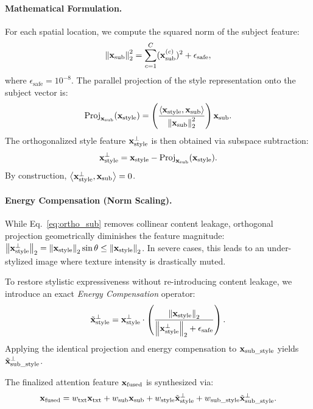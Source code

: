 \paragraph{Mathematical Formulation.}
For each spatial location, we compute the squared norm of the subject feature:
\begin{equation}
    \left\lVert\mathbf{x}_{\text{sub}}\right\rVert_2^2 = \sum_{c=1}^C (\mathbf{x}_{\text{sub}}^{(c)})^2 + \epsilon_{\text{safe}},
\end{equation}
where $\epsilon_{\text{safe}} = 10^{-8}$. The parallel projection of the style representation onto the subject vector is:
\begin{equation}
    \text{Proj}_{\mathbf{x}_{\text{sub}}}(\mathbf{x}_{\text{style}}) = \left( \frac{\left\langle \mathbf{x}_{\text{style}}, \mathbf{x}_{\text{sub}} \right\rangle}{\left\lVert\mathbf{x}_{\text{sub}}\right\rVert_2^2} \right) \mathbf{x}_{\text{sub}}.
\end{equation}
The orthogonalized style feature $\mathbf{x}_{\text{style}}^\perp$ is then obtained via subspace subtraction:
\begin{equation}
    \mathbf{x}_{\text{style}}^\perp = \mathbf{x}_{\text{style}} - \text{Proj}_{\mathbf{x}_{\text{sub}}}(\mathbf{x}_{\text{style}}).
    \label{eq:ortho_sub}
\end{equation}
By construction, $\left\langle \mathbf{x}_{\text{style}}^\perp, \mathbf{x}_{\text{sub}} \right\rangle = 0$.

\paragraph{Energy Compensation (Norm Scaling).}
While Eq.~\eqref{eq:ortho_sub} removes collinear content leakage, orthogonal projection geometrically diminishes the feature magnitude: $\left\lVert\mathbf{x}_{\text{style}}^\perp\right\rVert_2 = \left\lVert\mathbf{x}_{\text{style}}\right\rVert_2 \sin \theta \le \left\lVert\mathbf{x}_{\text{style}}\right\rVert_2$. In severe cases, this leads to an under-stylized image where texture intensity is drastically muted.

To restore stylistic expressiveness without re-introducing content leakage, we introduce an exact \textit{Energy Compensation} operator:
\begin{equation}
    \tilde{\mathbf{x}}_{\text{style}}^\perp = \mathbf{x}_{\text{style}}^\perp \cdot \left( \frac{\left\lVert\mathbf{x}_{\text{style}}\right\rVert_2}{\left\lVert\mathbf{x}_{\text{style}}^\perp\right\rVert_2 + \epsilon_{\text{safe}}} \right).
    \label{eq:energy_comp}
\end{equation}
Applying the identical projection and energy compensation to $\mathbf{x}_{\text{sub\_style}}$ yields $\tilde{\mathbf{x}}_{\text{sub\_style}}^\perp$. 

The finalized attention feature $\mathbf{x}_{\text{fused}}$ is synthesized via:
\begin{equation}
    \mathbf{x}_{\text{fused}} = w_{\text{txt}} \mathbf{x}_{\text{txt}} + w_{\text{sub}} \mathbf{x}_{\text{sub}} + w_{\text{style}} \tilde{\mathbf{x}}_{\text{style}}^\perp + w_{\text{sub\_style}} \tilde{\mathbf{x}}_{\text{sub\_style}}^\perp.
    \label{eq:attn_synthesis}
\end{equation}


